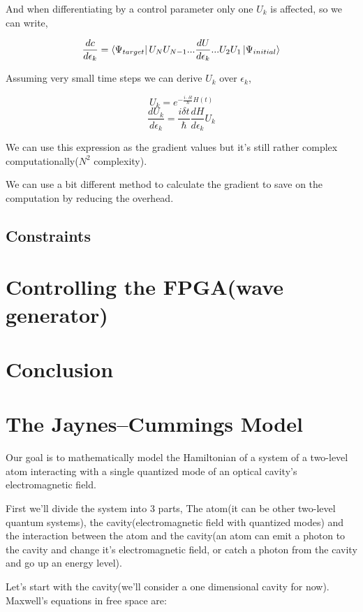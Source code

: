 \documentclass{article}
\numberwithin{equation}{section}
\begin{document}
And when differentiating by a control parameter only one $U_k$ is affected, so we can write,

$$\frac{dc}{d\epsilon_k} = \bra{\Psi_{target}}U_N U_{N-1}...\frac{dU}{d\epsilon_k}...U_2 U_1\ket{\Psi_{initial}} $$

Assuming very small time steps we can derive $U_k$ over $\epsilon_k$,

$$U_k = e^{-\frac{i\cdot \delta t}{\hbar}H(t)}$$
$$\frac{dU_k}{d\epsilon_k} = \frac{i \delta t}{\hbar}\frac{dH}{d\epsilon_k} U_k$$

We can use this expression as the gradient values but it's still rather complex computationally($N^2$ complexity).\par
We can use a bit different method to calculate the gradient to save on the computation by reducing the overhead.


\subsection{Constraints}

\newpage
\section{Controlling the FPGA(wave generator)}

\newpage
\section{Conclusion}


\newpage

\appendix
\section{The Jaynes–Cummings Model}
Our goal is to mathematically model the Hamiltonian of a system of a two-level atom interacting with a single quantized mode of an optical cavity's electromagnetic field. %
\par
First we'll divide the system into 3 parts, The atom(it can be other two-level quantum systems), the cavity(electromagnetic field with quantized modes) and the interaction between the atom and the cavity(an atom can emit a photon to the cavity and change it's electromagnetic field, or catch a photon from the cavity and go up an energy level).\par  %
Let's start with the cavity(we'll consider a one dimensional cavity for now). Maxwell's equations in free space are:
\end{document}
